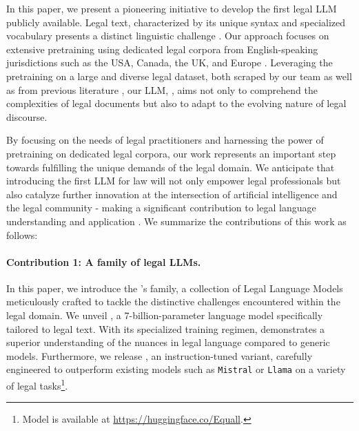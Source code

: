 In this paper, we present a pioneering initiative to develop the first legal LLM publicly available.
Legal text, characterized by its unique syntax and specialized vocabulary presents a distinct linguistic challenge \cite{chalkidis2020legal,niklaus2021swiss}.
Our approach focuses on extensive pretraining \cite{gururangan2020don,yao2021adapt} using dedicated legal corpora from English-speaking jurisdictions such as the USA, Canada, the UK, and Europe \cite{aletras2016predicting,gutierrez2021spanish}.
Leveraging the pretraining on a large and diverse legal dataset, both scraped by our team as well as from previous literature \citep{niklaus2022budgetlongformer}, our LLM, \ourmodel{}, aims not only to comprehend the complexities of legal documents but also to adapt to the evolving nature of legal discourse.

By focusing on the needs of legal practitioners and harnessing the power of pretraining on dedicated legal corpora, our work represents an important step towards fulfilling the unique demands of the legal domain. We anticipate that introducing the first LLM for law will not only empower legal professionals but also catalyze further innovation at the intersection of artificial intelligence and the legal community - making a significant contribution to legal language understanding and application \cite{prakken2013logical}. We summarize the contributions of this work as follows:

\paragraph{Contribution 1: A family of legal LLMs.} In this paper, we introduce the \ourmodel{}'s family, a collection of Legal Language Models meticulously crafted to tackle the distinctive challenges encountered within the legal domain. We unveil \ourmodel{}, a 7-billion-parameter language model specifically tailored to legal text. With its specialized training regimen, \ourmodel{} demonstrates a superior understanding of the nuances in legal language compared to generic models. Furthermore, we release \ourmodelift{}, an instruction-tuned variant, carefully engineered to outperform existing models such as \texttt{Mistral} or \texttt{Llama} on a variety of legal tasks\footnote{Model is available at \url{https://huggingface.co/Equall}.}.


